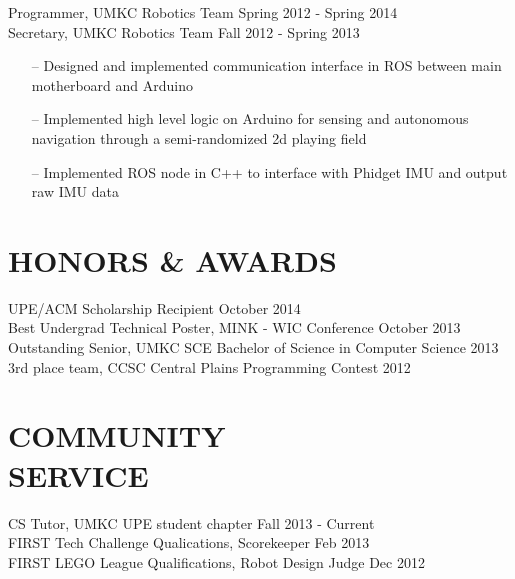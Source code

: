 \documentclass[line,margin]{res}
\begin{document}
\begin{resume}
		
		Programmer, UMKC Robotics Team \hfill Spring 2012 - Spring 2014\\ 
		Secretary, UMKC Robotics Team \hfill  Fall 2012 - Spring 2013 	
		\begin{itemize} [leftmargin=5mm]  \itemsep -2pt %
                 \item[--] Designed and implemented communication interface in ROS between main motherboard and Arduino 
				 \item[--] Implemented high level logic on Arduino for sensing and autonomous navigation through a semi-randomized 2d playing field
                 \item[--] Implemented ROS node in C++ to interface with Phidget IMU and output raw IMU data
                 \end{itemize} 
		
\section{HONORS \& AWARDS}
		UPE/ACM Scholarship Recipient \hfill October 2014 \\
		Best Undergrad Technical Poster, MINK - WIC Conference \hfill October 2013	\\
		Outstanding Senior, UMKC SCE Bachelor of Science in Computer Science \hfill 2013 \\
		3rd place team, CCSC Central Plains Programming Contest \hfill 2012 
\section{COMMUNITY \\ SERVICE}  
            	CS Tutor, UMKC UPE student chapter  \hfill Fall 2013 - Current \\
                FIRST Tech Challenge Qualications, Scorekeeper \hfill Feb 2013 \\
		FIRST LEGO League Qualifications, Robot Design Judge \hfill Dec 2012  \\
\end{resume}
\end{document}
